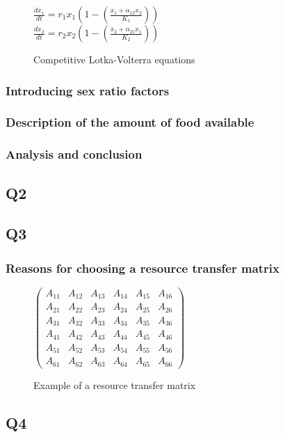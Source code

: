 \documentclass[12pt]{article}
\begin{document}
\begin{figure}[h]
	\large
	\centering
	$\frac{dx_1}{dt}=r_1x_1(1-(\frac{x_1+\alpha_{12}x_2}{K_1}))$ \\
	$\frac{dx_2}{dt}=r_2x_2(1-(\frac{x_2+\alpha_{21}x_1}{K_2}))$
	\caption*{Competitive Lotka-Volterra equations}
\end{figure}
\subsubsection*{Introducing sex ratio factors}

\subsubsection*{Description of the amount of food available}

\subsubsection*{Analysis and conclusion}
\subsection{Q2}
\subsection{Q3}
\subsubsection*{Reasons for choosing a resource transfer matrix}
\begin{figure}[h]
	\centering
	$\begin{pmatrix}
			A_{11} & A_{12} & A_{13} & A_{14} & A_{15} & A_{16} \\
			A_{21} & A_{22} & A_{23} & A_{24} & A_{25} & A_{26} \\
			A_{31} & A_{32} & A_{33} & A_{34} & A_{35} & A_{36} \\
			A_{41} & A_{42} & A_{43} & A_{44} & A_{45} & A_{46} \\
			A_{51} & A_{52} & A_{53} & A_{54} & A_{55} & A_{56} \\
			A_{61} & A_{62} & A_{63} & A_{64} & A_{65} & A_{66}
		\end{pmatrix}$
	\caption*{Example of a resource transfer matrix}
\end{figure}
\subsection{Q4}
\end{document}
